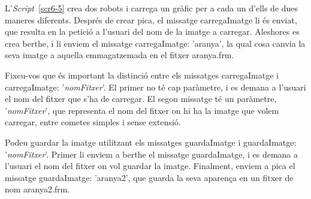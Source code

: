 L'\emph{Script}~\ref{scr6-5} crea dos robots i carrega un gràfic per a cada un d'ells de dues maneres diferents. Després de crear \textsf{pica}, el missatge \textsf{carregaImatge} li és enviat, que resulta en la petició a l'usuari del nom de la imatge a carregar. Aleshores es crea \textsf{berthe}, i li enviem el missatge \textsf{carregaImatge: 'aranya'}, la qual cosa canvia la seva imatge a aquella emmagatzemada en el fitxer \textsf{aranya.frm}.

Fixeu-vos que és important la distinció entre els missatges \textsf{carregaImatge} i \textsf{carregaImatge: '{\itshape nomFitxer}'}. El primer no té cap paràmetre, i es demana a l'usuari el nom del fitxer que s'ha de carregar. El segon missatge té un paràmetre, \textsf{'{\itshape nomFitxer}'}, que representa el nom del fitxer on hi ha la imatge que volem carregar, entre cometes simples i sense extensió. 

Podeu guardar la imatge utilitzant els missatges \textsf{guardaImatge} i \textsf{guardaImatge: '{\itshape nomFitxer}'}. Primer li enviem a \textsf{berthe} el missatge \textsf{guardaImatge}, i es demana a l'usuari el nom del fitxer on vol guardar la imatge. Finalment, enviem a \textsf{pica} el missatge \textsf{guardaImatge: 'aranya2'}, que guarda la seva aparença en un fitxer de nom \textsf{aranya2.frm}. 


